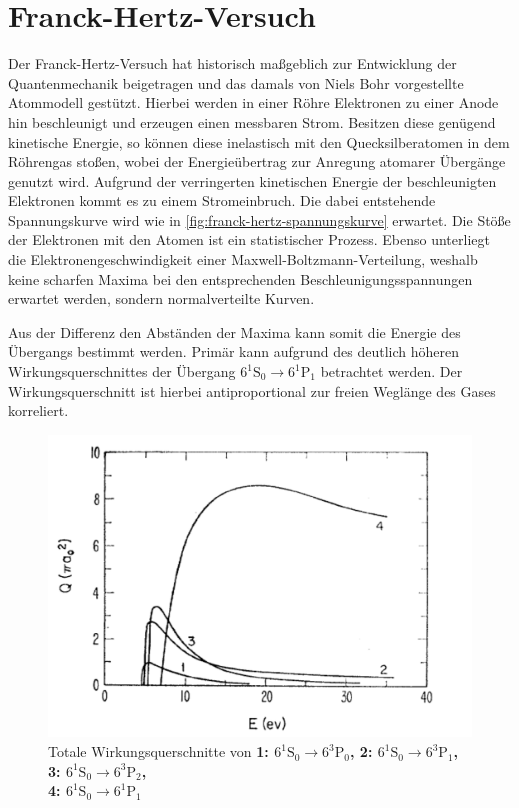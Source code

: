 \section{Franck-Hertz-Versuch}\label{sec:franck-hertz}
Der Franck-Hertz-Versuch hat historisch maßgeblich zur Entwicklung 
der Quantenmechanik beigetragen und das damals von Niels Bohr vorgestellte 
Atommodell gestützt. Hierbei werden in einer Röhre Elektronen zu einer Anode hin 
beschleunigt und erzeugen einen messbaren 
Strom. Besitzen diese genügend kinetische Energie, so können 
diese inelastisch mit den Quecksilberatomen in dem Röhrengas stoßen, 
wobei der Energieübertrag zur Anregung atomarer Übergänge genutzt wird. 
Aufgrund der verringerten kinetischen Energie der beschleunigten Elektronen 
kommt es zu einem Stromeinbruch. Die dabei entstehende Spannungskurve wird 
wie in \cref{fig:franck-hertz-spannungskurve} erwartet. Die Stöße der Elektronen 
mit den Atomen ist ein statistischer Prozess. Ebenso unterliegt die Elektronengeschwindigkeit
einer Maxwell-Boltzmann-Verteilung, weshalb keine scharfen Maxima 
bei den entsprechenden Beschleunigungsspannungen erwartet werden, sondern 
normalverteilte Kurven.

Aus der Differenz den Abständen der Maxima kann somit die 
Energie des Übergangs bestimmt werden. Primär kann 
aufgrund des deutlich höheren Wirkungsquerschnittes der Übergang
${}6^1\mathrm S_0\rightarrow 6^1\mathrm P_1$ betrachtet werden. Der Wirkungsquerschnitt ist 
hierbei antiproportional zur freien Weglänge des Gases korreliert. 


\begin{figure}[h]
    \centering
    \includegraphics[width=0.6\linewidth]{../figs/querschnitt}
    \caption{Totale Wirkungsquerschnitte von \bf 1: $6^1\mathrm S_0\rightarrow 6^3\mathrm P_0$,
    \bf 2: $6^1\mathrm S_0\rightarrow 6^3\mathrm P_1$, 
    \bf 3: $6^1\mathrm S_0\rightarrow 6^3\mathrm P_2$,\\
    \bf 4: $6^1\mathrm S_0\rightarrow 6^1\mathrm P_1$ \cite{skript}}
    \label{fig:wirkungsquerschnitte}
\end{figure}

